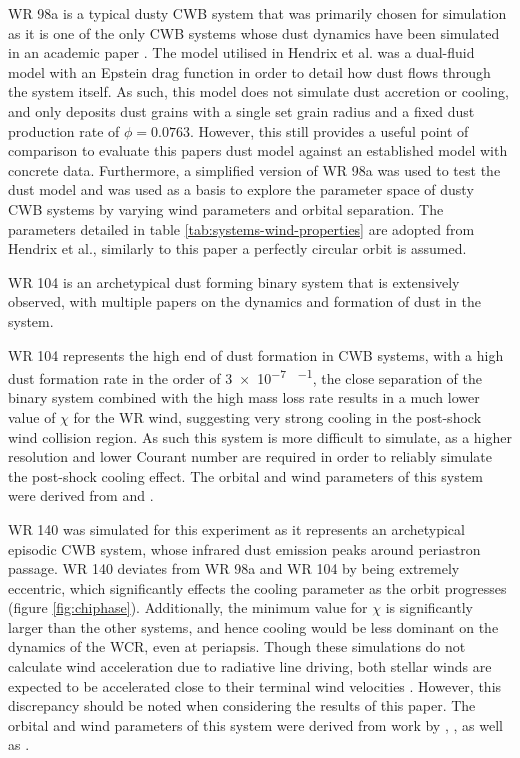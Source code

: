 WR 98a is a typical dusty CWB system that was primarily chosen for simulation as it is one of the only CWB systems whose dust dynamics have been simulated in an academic paper \parencite{hendrix_pinwheels_2016}. The model utilised in Hendrix et al. was a dual-fluid model with an Epstein drag function in order to detail how dust flows through the system itself. As such, this model does not simulate dust accretion or cooling, and only deposits dust grains with a single set grain radius and a fixed dust production rate of $\phi = 0.0763$. However, this still provides a useful point of comparison to evaluate this papers dust model against an established model with concrete data. Furthermore, a simplified version of WR 98a was used to test the dust model and was used as a basis to explore the parameter space of dusty CWB systems by varying wind parameters and orbital separation. The parameters detailed in table \ref{tab:systems-wind-properties} are adopted from Hendrix et al., similarly to this paper a perfectly circular orbit is assumed.


WR 104 is an archetypical dust forming binary system that is extensively observed, with multiple papers on the dynamics and formation of dust in the system. %

WR 104 represents the high end of dust formation in CWB systems, with a high dust formation rate in the order of \num{3e-7} \si{\solarmass\per\year}, the close separation of the binary system combined with the high mass loss rate results in a much lower value of $\chi$ for the WR wind, suggesting very strong cooling in the post-shock wind collision region. As such this system is more difficult to simulate, as a higher resolution and lower Courant number are required in order to reliably simulate the post-shock cooling effect.
The orbital and wind parameters of this system were derived from \cite{soulain_sphere_2018} and \cite{harries_three-dimensional_2004}. 




WR 140 was simulated for this experiment as it represents an archetypical episodic CWB system, whose infrared dust emission peaks around periastron passage. WR 140 deviates from WR 98a and WR 104 by being extremely eccentric, which significantly effects the cooling parameter as the orbit progresses (figure \ref{fig:chiphase}). Additionally, the minimum value for $\chi$ is significantly larger than the other systems, and hence cooling would be less dominant on the dynamics of the WCR, even at periapsis. Though these simulations do not calculate wind acceleration due to radiative line driving, both stellar winds are expected to be accelerated close to their terminal wind velocities \parencite{lamersIntroductionStellarWinds1999}. However, this discrepancy should be noted when considering the results of this paper. %
The orbital and wind parameters of this system were derived from work by \cite{monnier_first_2011}, \cite{usov_stellar_1991}, as well as \cite{thomasOrbitStellarMasses2021}.

